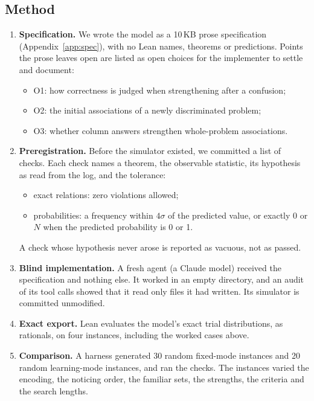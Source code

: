 \documentclass[11pt]{article}
\begin{document}
\subsection{Method}

\begin{enumerate}
  \item \textbf{Specification.} We wrote the model as a 10\,KB prose specification (Appendix~\ref{app:spec}), with no Lean names, theorems or predictions. Points the prose leaves open are listed as open choices for the implementer to settle and document:
  \begin{itemize}
    \item O1: how correctness is judged when strengthening after a confusion;
    \item O2: the initial associations of a newly discriminated problem;
    \item O3: whether column answers strengthen whole-problem associations.
  \end{itemize}
  \item \textbf{Preregistration.} Before the simulator existed, we committed a list of checks. Each check names a theorem, the observable statistic, its hypothesis as read from the log, and the tolerance:
  \begin{itemize}
    \item exact relations: zero violations allowed;
    \item probabilities: a frequency within $4\sigma$ of the predicted value, or exactly 0 or $N$ when the predicted probability is 0 or 1.
  \end{itemize}
  A check whose hypothesis never arose is reported as vacuous, not as passed.
  \item \textbf{Blind implementation.} A fresh agent (a Claude model) received the specification and nothing else. It worked in an empty directory, and an audit of its tool calls showed that it read only files it had written. Its simulator is committed unmodified.
  \item \textbf{Exact export.} Lean evaluates the model's exact trial distributions, as rationals, on four instances, including the worked cases above.
  \item \textbf{Comparison.} A harness generated 30 random fixed-mode instances and 20 random learning-mode instances, and ran the checks. The instances varied the encoding, the noticing order, the familiar sets, the strengths, the criteria and the search lengths.
\end{enumerate}
\end{document}
